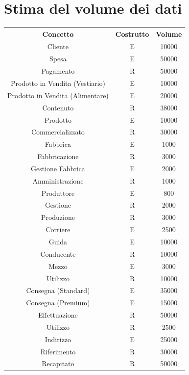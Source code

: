 \documentclass[a4paper,12pt]{report}
\begin{document}
\section{Stima del volume dei dati}
\begin{center}
    \begin{tabular}{ | c  c  c|} 
    \hline
    Concetto&Costrutto&Volume \\
    \hline
	\hline
    Cliente&E&10000 \\
	Spesa&E&50000 \\
	Pagamento&R&50000 \\
	\hline
	Prodotto in Vendita (Vestiario) &E&10000 \\
	Prodotto in Vendita (Alimentare) &E&20000 \\
	Contenuto&R&38000 \\
	Prodotto&E&10000 \\
	Commercializzato&R&30000 \\
	\hline
	Fabbrica&E&1000 \\
	Fabbricazione&R&3000 \\
	Gestione Fabbrica&E&2000 \\
	Amministrazione&R&1000 \\
	Produttore&E&800\\
	Gestione&R&2000 \\
	Produzione&R&3000\\
	\hline
	Corriere&E&2500\\
	Guida&E&10000\\
	Conducente&R&10000\\
	Mezzo&E&3000\\
	Utilizzo&R&10000\\
	Consegna (Standard) &E&35000\\
	Consegna (Premium) &E&15000\\
	Effettuazione&R&50000\\
	Utilizzo&R&2500\\
	Indirizzo&E&25000\\
	Riferimento&R&30000\\
	Recapitato&R&50000\\
    \hline
    \end{tabular}
\end{center}
\end{document}
